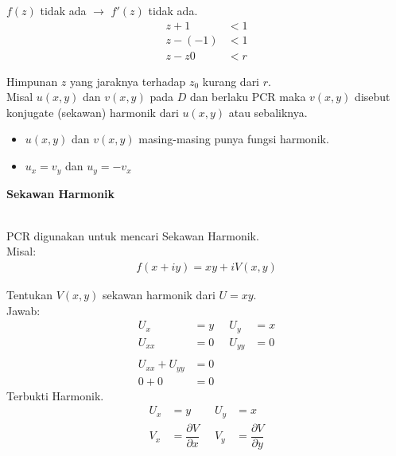 \documentclass{article}
\begin{document}
$f(z)$ tidak ada $\rightarrow$ $f'(z)$ tidak ada.
\begin{align}
    z + 1    & < 1
    \nonumber      \\
    z - (-1) & < 1
    \nonumber      \\
    z - z0   & < r
    \nonumber
\end{align}

Himpunan $z$ yang jaraknya terhadap $z_0$ kurang dari $r$.
\\

Misal  $u(x,y)$ dan  $v(x,y)$ pada $D$ dan berlaku PCR maka $v(x,y)$ disebut konjugate (sekawan) harmonik dari $u(x,y)$ atau sebaliknya.
\begin{itemize}
    \item $u(x,y)$ dan $v(x,y)$ masing-masing punya fungsi harmonik.
    \item $u_x = v_y$ dan $u_y = -v_x$
\end{itemize}


\newpage
\begin{center}
    \textbf{Sekawan Harmonik}
\end{center}
\leavevmode\\

PCR digunakan untuk mencari Sekawan Harmonik.\\

Misal:
\begin{align}
    f(x + iy) = xy + iV(x, y)
    \nonumber
\end{align}

Tentukan $V(x,y)$ sekawan harmonik dari $U = xy$.\\
Jawab:
\begin{align}
    U_x           & = y    \; & \;   U_y    & = x
    \nonumber                                     \\
    U_{xx}        & = 0    \; & \;   U_{yy} & = 0
    \nonumber                                     \\\nonumber\\
    U_{xx}+U_{yy} & =0
    \nonumber                                     \\
    0 + 0         & =0
    \nonumber
\end{align}
Terbukti Harmonik.\\

\begin{align}
    U_x & = y                                \; & \;   U_y & = x
    \nonumber                                                                                 \\
    V_x & = \dfrac{\partial V}{\partial x}   \; & \;   V_y & = \dfrac{\partial V}{\partial y}
    \nonumber
\end{align}
\end{document}
